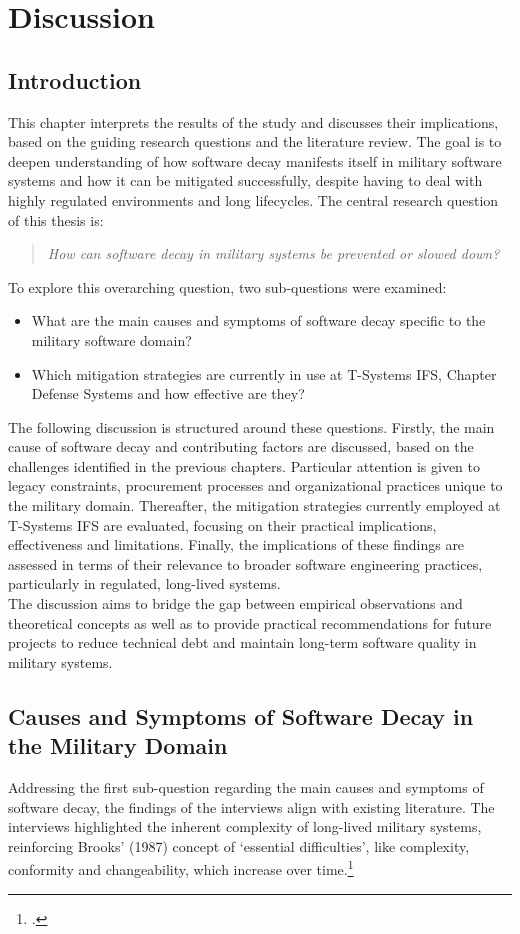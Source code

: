 \section{Discussion}
\subsection{Introduction}
This chapter interprets the results of the study and discusses their implications, based on the guiding research questions and the literature review. The goal is to deepen understanding of how software decay manifests itself in military software systems
and how it can be mitigated successfully, despite having to deal with highly regulated environments and long lifecycles.
The central research question of this thesis is:
\begin{quote}
\textit{How can software decay in military systems be prevented or slowed down?}
\end{quote}
To explore this overarching question, two sub-questions were examined:
\begin{itemize}
    \item What are the main causes and symptoms of software decay specific to the military software domain?
    \item Which mitigation strategies are currently in use at T-Systems IFS, Chapter Defense Systems and how effective are they?
\end{itemize}
The following discussion is structured around these questions. Firstly, the main cause of software decay and contributing factors are discussed, based on the challenges identified in the previous chapters. Particular attention is given to legacy constraints, procurement processes and organizational practices unique to the military domain.
Thereafter, the mitigation strategies currently employed at T-Systems IFS are evaluated, focusing on their practical implications, effectiveness and limitations. Finally, the implications of these findings are assessed in terms of their relevance to broader software engineering practices, particularly in regulated, long-lived systems.\\
The discussion aims to bridge the gap between empirical observations and theoretical concepts as well as to provide practical recommendations for future projects to reduce technical debt and maintain long-term software quality in military systems.\\

\subsection{Causes and Symptoms of Software Decay in the Military Domain}
Addressing the first sub-question regarding the main causes and symptoms of software decay, the findings of the interviews align with existing literature. The interviews highlighted the inherent complexity of long-lived military systems, reinforcing Brooks' (1987) concept of `essential difficulties', like complexity, conformity and changeability, which increase over time.\footcite[2-3]{brooksNoSilverBullet1987}\\

